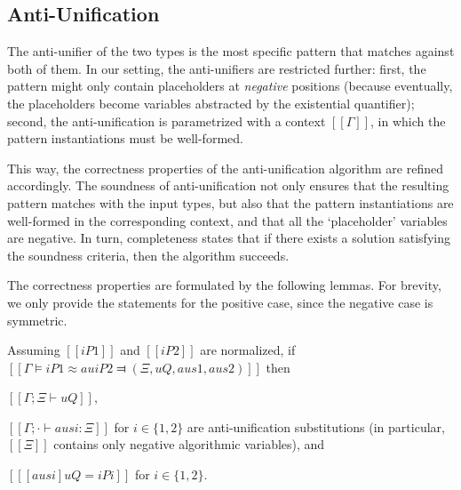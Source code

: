         

\subsection{Anti-Unification}

The anti-unifier of the two types is the most specific pattern that matches against both of them. 
In our setting, the anti-unifiers are restricted further: first, the pattern might only contain placeholders at 
\emph{negative} positions (because eventually, the placeholders become variables abstracted by the existential quantifier);
second, the anti-unification is parametrized with a context $[[Γ]]$, in which the pattern instantiations must be well-formed.

This way, the correctness properties of the anti-unification algorithm are refined accordingly.
The soundness of anti-unification not only ensures that the resulting pattern matches with 
the input types, but also that the pattern instantiations are well-formed in the corresponding context, and 
that all the `placeholder' variables are negative. In turn, completeness states that if there exists a solution 
satisfying the soundness criteria, then the algorithm succeeds.

The correctness properties are formulated by the following lemmas. For brevity, we only provide the statements for 
the positive case, since the negative case is symmetric.

\begin{lemma*}
    \label{lemma:au-soundness}
     Assuming $[[iP1]]$ and $[[iP2]]$ are normalized,
    if $[[Γ ⊨ iP1 ≈au iP2 ⫤ (Ξ, uQ, aus1, aus2)]]$
    then 
    \begin{enumerate*}
        \item $[[Γ ; Ξ ⊢ uQ]]$,
        \item $[[Γ ; · ⊢ ausi : Ξ]]$ for $i \in \{1,2\}$
        are anti-unification substitutions (in particular, $[[Ξ]]$ contains only negative algorithmic variables), and
        \item $[[ [ausi] uQ = iPi ]]$ for $i \in \{1,2\}$.
    \end{enumerate*}
\end{lemma*}

